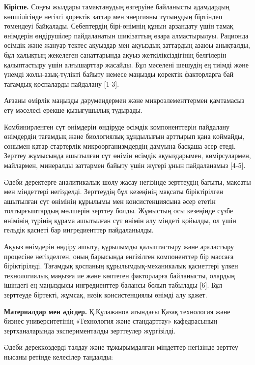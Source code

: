 \begin{multicols}{2}
{\bfseries Кіріспе.} Соңғы жылдары тамақтанудың өзгеруіне байланысты
адамдардың көпшілігінде негізгі қоректік заттар мен энергияны тұтынудың
біртіндеп төмендеуі байқалады. Себептердің бірі-өнімнің құнын арзандату
үшін тамақ өнімдерін өндірушілер пайдаланатын шикізаттың өзара
алмастырылуы. Рационда өсімдік және жануар тектес ақуыздар мен ақуыздық
заттардың азаюы анықталды, бұл халықтың жекелеген санаттарында ақуыз
жеткіліксіздігінің белгілерін қалыптастыру үшін алғышарттар жасайды. Бұл
мәселені шешудің ең тиімді және үнемді жолы-азық-түлікті байыту немесе
маңызды қоректік факторларға бай тағамдық қоспаларды пайдалану
{[}1-3{]}.

Ағзаны өмірлік маңызды дәрумендермен және микроэлементтермен қамтамасыз
ету мәселесі ерекше қызығушылық тудырады.

Комбинирленген сүт өнімдерін өндіруде өсімдік компоненттерін пайдалану
өнімдердің тағамдық және биологиялық құндылығын арттырып қана қоймайды,
сонымен қатар стартерлік микроорганизмдердің дамуына басқаша әсер етеді.
Зерттеу жұмысында ашытылған сүт өнімін өсімдік ақуыздарымен,
көмірсулармен, майлармен, минералды заттармен байыту үшін жүгері ұнын
пайдаланамыз {[}4-5{]}.

Әдеби деректерге аналитикалық шолу жасау негізінде зерттеудің бағыты,
мақсаты мен міндеттері негізделді. Зерттеудің бұл кезеңінің мақсаты
біріктірілген ашытылған сүт өнімінің құрылымы мен консистенциясына әсер
ететін толтырғыштардың мөлшерін зерттеу болды. Жұмыстың осы кезеңінде
сүзбе өнімінің түрінің құрама ашытылған сүт өнімін алу міндеті қойылды,
ол үшін гельдік қасиеті бар ингредиенттер пайдаланылды.

Ақуыз өнімдерін өндіру ашыту, құрылымды қалыптастыру және араластыру
процесіне негізделген, оның барысында енгізілген компоненттер бір
массаға біріктіріледі. Тағамдық қоспаның құрылымдық-механикалық
қасиеттері үлкен технологиялық маңызға ие және көптеген факторларға
байланысты, олардың ішіндегі ең маңыздысы ингредиенттер балансы болып
табылады {[}6{]}. Бұл зерттеуде біртекті, жұмсақ, нәзік консистенциялы
өнімді алу қажет.

{\bfseries Материалдар мен әдісдер.} Қ.Құлажанов атындағы Қазақ технология
және бизнес университетінің «Технология және стандарттау» кафедрасының
зертханаларында эксперименталды зерттеулер жүргізілді.

Әдеби дереккөздерді талдау және тұжырымдалған міндеттер негізінде
зерттеу нысаны ретінде келесілер таңдалды:


\end{multicols}
